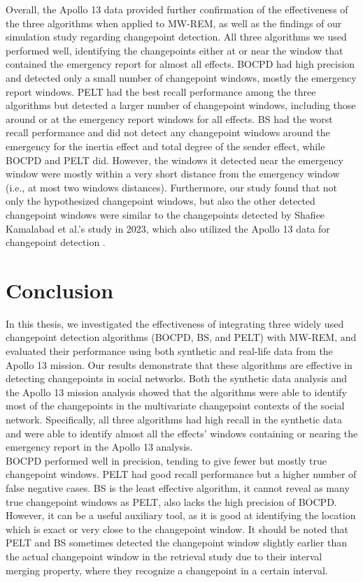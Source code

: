 \documentclass[]{interact}
\theoremstyle{plain}%
\theoremstyle{definition}
\theoremstyle{remark}
\begin{document}
	Overall, the Apollo 13 data provided further confirmation of the effectiveness of the three algorithms when applied to MW-REM, as well as the findings of our simulation study regarding changepoint detection. All three algorithms we used performed well, identifying the changepoints either at or near the window that contained the emergency report for almost all effects. BOCPD had high precision and detected only a small number of changepoint windows, mostly the emergency report windows. PELT had the best recall performance among the three algorithms but detected a larger number of changepoint windows, including those around or at the emergency report windows for all effects. BS had the worst recall performance and did not detect any changepoint windows around the emergency for the inertia effect and total degree of the sender effect, while BOCPD and PELT did. However, the windows it detected near the emergency window were mostly within a very short distance from the emergency window (i.e., at most two windows distances). Furthermore, our study found that not only the hypothesized changepoint windows, but also the other detected changepoint windows were similar to the changepoints detected by Shafiee Kamalabad et al.'s study in 2023, which also utilized the Apollo 13 data for changepoint detection \cite{kamalabadWhatPointChange}.
	
	\section{\fontsize{14}{15}\selectfont Conclusion} \label{sec:conclusion}
	
	\hspace{0.28cm} In this thesis, we investigated the effectiveness of integrating three widely used changepoint detection algorithms (BOCPD, BS, and PELT) with MW-REM, and evaluated their performance using both synthetic and real-life data from the Apollo 13 mission. Our results demonstrate that these algorithms are effective in detecting changepoints in social networks. Both the synthetic data analysis and the Apollo 13 mission analysis showed that the algorithms were able to identify most of the changepoints in the multivariate changepoint contexts of the social network. Specifically, all three algorithms had high recall in the synthetic data and were able to identify almost all the effects' windows containing or nearing the emergency report in the Apollo 13 analysis. \\
	
	BOCPD performed well in precision, tending to give fewer but mostly true changepoint windows. PELT had good recall performance but a higher number of false negative cases. BS is the least effective algorithm, it cannot reveal as many true changepoint windows as PELT, also lacks the high precision of BOCPD. However, it can be a useful auxiliary tool, as it is good at identifying the location which is exact or very close to the changepoint window. It should be noted that PELT and BS sometimes detected the changepoint window slightly earlier than the actual changepoint window in the retrieval study due to their interval merging property, where they recognize a changepoint in a certain interval. \\
	
\end{document}
